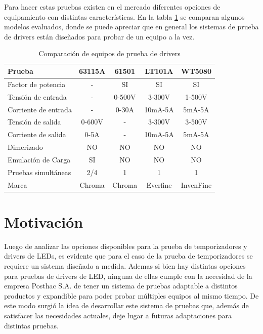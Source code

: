 	Para hacer estas pruebas existen en el mercado diferentes opciones  de equipamiento con distintas características. En la tabla \ref{tab:ProbadoresDrivers} se comparan algunos modelos evaluados, donde se puede apreciar que en general los sistemas de prueba de drivers están diseñados para probar de un equipo a la vez.
	
	\begin{table}[h]
	\centering
	\caption[Tabla de comparación de equipos de prueba de drivers]{Comparación de equipos de prueba de drivers}
	\begin{tabular}{l c c c c}    
		\toprule
		\textbf{Prueba} 	 & \textbf{63115A} & \textbf{61501}& \textbf{LT101A}		& \textbf{WT5080}  \\
		\midrule
		Factor de potencia & - & SI & SI & SI \\		
		Tensión de entrada	 & - & 0-500V & 3-300V & 1-500V \\
		Corriente de entrada& - & 0-30A & 10mA-5A & 5mA-5A \\
		Tensión de salida & 0-600V & - & 3-300V & 3-500V \\		
		Corriente de salida & 0-5A & - & 10mA-5A & 5mA-5A \\		
		Dimerizado & NO & NO & NO & NO \\		
		Emulación de Carga & SI & NO & NO & NO \\
		Pruebas simultáneas &2/4 & 1 & 1 & 1 \\
		Marca & Chroma & Chroma & Everfine & InvenFine \\
		\bottomrule
		\hline
	\end{tabular}
	\label{tab:ProbadoresDrivers}
\end{table}

\section{Motivación}

Luego de analizar las opciones disponibles para la prueba de temporizadores y drivers de LEDs, es evidente que para el caso de la prueba de temporizadores se requiere un sistema diseñado a medida. Ademas si bien hay distintas opciones para pruebas de drivers de LED, ninguna de ellas cumple con la necesidad de la empresa Posthac S.A. de tener un sistema de pruebas adaptable a distintos productos y expandible para poder probar múltiples equipos al mismo tiempo. De este modo surgió la idea de desarrollar este sistema de pruebas que, además de satisfacer las necesidades actuales, deje lugar a futuras adaptaciones para distintas pruebas.

